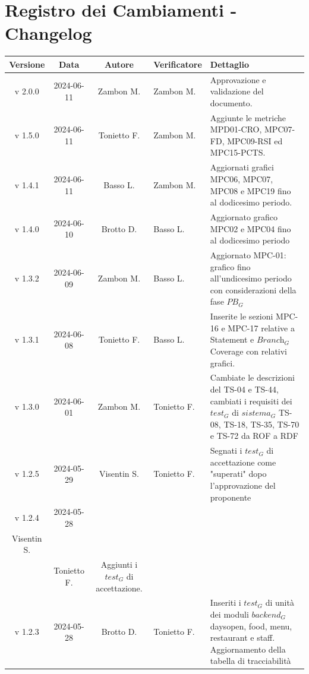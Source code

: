 \documentclass[12pt, oneside]{article}
\begin{document}
\section*{Registro dei Cambiamenti - Changelog}
\begin{longtable}{|c|c|c|p{3cm}|p{6cm}|}
\hline
\textbf{Versione} & \textbf{Data} & \textbf{Autore} & \textbf{Verificatore} & \textbf{Dettaglio} \\
\hline
v 2.0.0 & 2024-06-11 & Zambon M. & Zambon M. & Approvazione e validazione del documento. \\ 
\hline
v 1.5.0 & 2024-06-11 & Tonietto F. & Zambon M. & Aggiunte le metriche MPD01-CRO, MPC07-FD, MPC09-RSI ed MPC15-PCTS. \\ 
\hline
v 1.4.1 & 2024-06-11 & Basso L. & Zambon M. & Aggiornati grafici MPC06, MPC07, MPC08 e MPC19 fino al dodicesimo periodo.  \\ 
\hline
v 1.4.0 & 2024-06-10 & Brotto D. & Basso L. & Aggiornato grafico MPC02 e MPC04 fino al dodicesimo periodo  \\ 
\hline
v 1.3.2 & 2024-06-09 & Zambon M. & Basso L. & Aggiornato MPC-01: grafico fino all'undicesimo periodo con considerazioni della fase $\textit{PB}_G$  \\ 
\hline
v 1.3.1 & 2024-06-08 & Tonietto F. & Basso L. & Inserite le sezioni MPC-16 e MPC-17 relative a Statement e $\textit{Branch}_G$ Coverage con relativi grafici.  \\ 
\hline
v 1.3.0 & 2024-06-01 & Zambon M. & Tonietto F. & Cambiate le descrizioni del TS-04 e TS-44, cambiati i requisiti dei $\textit{test}_G$ di $\textit{sistema}_G$ TS-08, TS-18, TS-35, TS-70 e TS-72 da ROF a RDF \\ 
\hline
v 1.2.5 & 2024-05-29 & Visentin S. & Tonietto F. & Segnati i $\textit{test}_G$ di accettazione come "superati" dopo l'approvazione del proponente \\ 
\hline
v 1.2.4 & 2024-05-28 & \begin{tabular}[c]{@{}c@{}}
    Zaupa R. \\
    Visentin S. \\
  \end{tabular}   & Tonietto F. & Aggiunti i $\textit{test}_G$ di accettazione. \\
\hline
v 1.2.3 & 2024-05-28 & Brotto D. & Tonietto F. & Inseriti i $\textit{test}_G$ di unità dei moduli $\textit{backend}_G$ daysopen, food, menu, restaurant e staff. Aggiornamento della tabella di tracciabilità \\
\hline

\end{longtable}
\end{document}
